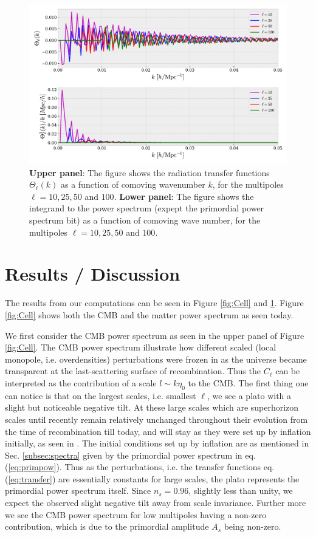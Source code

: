 \documentclass[twocolumn]{aastex62}
\begin{document}
\begin{figure}
    \includegraphics[scale = 0.65]{Figures/Transfer_func.pdf}
    \caption{\textbf{Upper panel}: The figure shows the radiation transfer functions $\Theta_\ell(k)$ as a function of comoving wavenumber $k$, for the multipoles $\ell = 10, 25, 50$ and $100$. \textbf{Lower panel}: The figure shows the integrand to the power spectrum (expept the primordial power spectrum bit) as a function of comoving wave number, for the multipoles $\ell = 10, 25, 50$ and $100$.}
    \label{fig:Transfer_func}
\end{figure}

\section{Results / Discussion}\label{sec:Results/Discussion}
The results from our computations can be seen in Figure \ref{fig:Cell} and \ref{fig:Transfer_func}. Figure \ref{fig:Cell} shows both the CMB and the matter power spectrum as seen today. 

We first consider the CMB power spectrum as seen in the upper panel of Figure \ref{fig:Cell}. The CMB power spectrum illustrate how different scaled (local monopole, i.e. overdensities) perturbations were frozen in as the universe became transparent at the last-scattering surface of recombination. Thus the $C_\ell$ can be interpreted as the contribution of a scale $l\sim k\eta_0$ to the CMB. The first thing one can notice is that on the largest scales, i.e. smallest $\ell$, we see a plato with a slight but noticeable negative tilt. At these large scales which are superhorizon scales until recently remain relatively unchanged throughout their evolution from the time of recombination till today, and will stay as they were set up by inflation initially, as seen in \cite{stutzer:2020c}. The initial conditions set up by inflation are as mentioned in Sec. \ref{subsec:spectra} given by the primordial power spectrum in eq. (\ref{eq:primpow}). Thus as the perturbations, i.e. the transfer functions eq. (\ref{eq:transfer}) are essentially constants for large scales, the plato represents the primordial power spectrum itself. Since $n_s =0.96$, slightly less than unity, we expect the observed slight negative tilt away from scale invariance. Further more we see the CMB power spectrum for low multipoles having a non-zero contribution, which is due to the primordial amplitude $A_s$ being non-zero.
\end{document}
